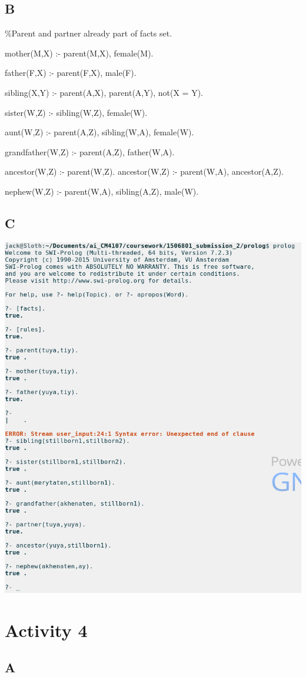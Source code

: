 \documentclass{article}
\begin{document}
\subsection*{B}

\%Parent and partner already part of facts set.

mother(M,X) :- parent(M,X), female(M).

father(F,X) :- parent(F,X), male(F).

sibling(X,Y) :- parent(A,X), parent(A,Y), not(X = Y).

sister(W,Z) :- sibling(W,Z), female(W).

aunt(W,Z) :- parent(A,Z), sibling(W,A), female(W).

grandfather(W,Z) :- parent(A,Z), father(W,A).

ancestor(W,Z) :- parent(W,Z).
ancestor(W,Z) :- parent(W,A), ancestor(A,Z).

nephew(W,Z) :- parent(W,A), sibling(A,Z), male(W).

\newpage
\subsection*{C}

\includegraphics[scale=0.5]{testing}

\newpage
\section*{Activity 4}
\subsection*{A}
\end{document}
